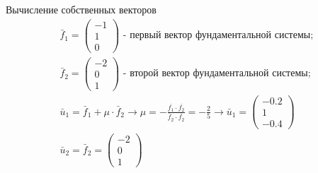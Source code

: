 \begin{frame}{Вычисление собственных векторов}
\[
    \begin{aligned}
    &\bar{f}_{1}=\left(\begin{array}{r}-1 \\ 1 \\ 0\end{array}\right) \text { - первый вектор фундаментальной системы; } \\
    &\bar{f}_{2}=\left(\begin{array}{r}-2 \\ 0 \\ 1\end{array}\right) \text { - второй вектор фундаментальной системы; } \\
    &\bar{u}_{1}=\bar{f}_{1}+\mu \cdot \bar{f}_{2} \rightarrow \mu=-\frac{\overline{f_{1}} \cdot \overline{f_{2}}}{\bar{f}_{2} \cdot \overline{f_{2}}}=-\frac{2}{5} \rightarrow \bar{u}_{1}=
    \left(\begin{array}{r}-0.2 \\ 1 \\ -0.4\end{array}\right) \\
    &\bar{u}_{2}=\bar{f}_{2}=\left(\begin{array}{r}-2 \\ 0 \\ 1\end{array}\right)
    \end{aligned}
\]
\end{frame}
